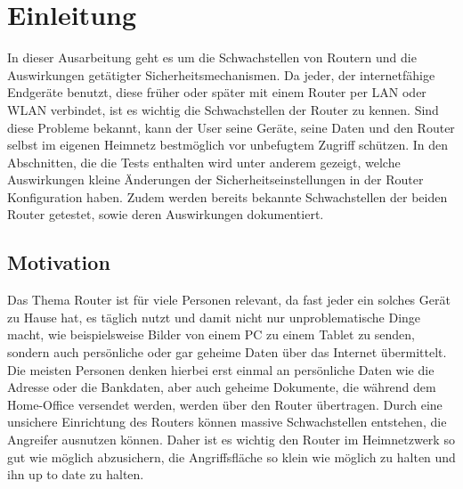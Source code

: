 	
	\listoffigures
	
	\listoftables
	
	
	\chapter{Einleitung}
	In dieser Ausarbeitung geht es um die Schwachstellen von Routern und die 
	Auswirkungen getätigter Sicherheitsmechanismen. Da jeder, der internetfähige
	Endgeräte benutzt, diese früher oder später mit einem Router per LAN oder WLAN verbindet,
	ist es wichtig die Schwachstellen der Router zu kennen. Sind diese Probleme
	bekannt, kann der User seine Geräte, seine Daten und den
	Router selbst im eigenen Heimnetz bestmöglich vor unbefugtem Zugriff schützen. 
	In den Abschnitten, die die Tests enthalten wird unter
	anderem gezeigt, welche Auswirkungen kleine Änderungen der Sicherheitseinstellungen
	in der Router Konfiguration haben. Zudem werden bereits bekannte Schwachstellen
	der beiden Router getestet, sowie deren Auswirkungen dokumentiert.

	\section{Motivation}
	Das Thema Router ist für viele Personen relevant, da fast jeder ein 
	solches Gerät zu Hause hat, es täglich nutzt und damit nicht nur unproblematische
	Dinge macht, wie beispielsweise Bilder von einem PC zu einem Tablet zu senden, sondern auch
	persönliche oder gar geheime Daten über das Internet übermittelt. Die meisten
	Personen denken hierbei erst einmal an persönliche Daten wie die Adresse oder 
	die Bankdaten, aber auch geheime Dokumente, die während dem Home-Office versendet
	werden, werden über den Router übertragen. Durch eine unsichere Einrichtung des
	Routers können massive Schwachstellen entstehen, die Angreifer ausnutzen können.
	Daher ist es wichtig den Router im Heimnetzwerk so gut wie möglich abzusichern, 
	die Angriffsfläche so klein wie möglich zu halten und ihn up to date zu halten.
	\cite{chalhoub2023, bsi} %

